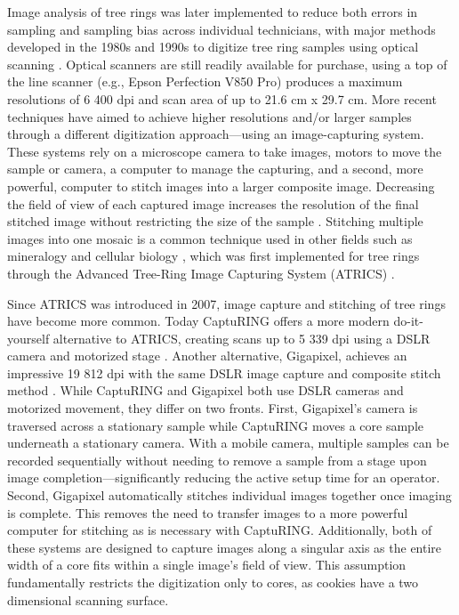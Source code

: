 \documentclass[a4paper,12pt]{article}
\begin{document}
Image analysis of tree rings was later implemented to reduce both errors in sampling and sampling bias across individual technicians, with major methods developed in the 1980s and 1990s to digitize tree ring samples using optical scanning \citep{mcmillin_application_1982} \citep{guay_new_1992}. Optical scanners are still readily available for purchase, using a top of the line scanner (e.g., Epson Perfection V850 Pro) produces a maximum resolutions of 6 400 dpi and scan area of up to 21.6 cm x 29.7 cm.
More recent techniques have aimed to achieve higher resolutions and/or larger samples through a different digitization approach---using an image-capturing system. These systems rely on a microscope camera to take images, motors to move the sample or camera, a computer to manage the capturing, and a second, more powerful, computer to stitch images into a larger composite image.
Decreasing the field of view of each captured image increases the resolution of the final stitched image without restricting the size of the sample \citep{muhlich_stitching_2022}.
Stitching multiple images into one mosaic is a common technique used in other fields such as mineralogy and cellular biology \citep{ro_image_2021,mohammadi_fast_2024}, which was
first implemented for tree rings through the Advanced Tree-Ring Image Capturing System (ATRICS) \citep{levanic_atrics_2007}. %

Since ATRICS was introduced in 2007, image capture and stitching of tree rings have become more common. Today CaptuRING offers a more modern do-it-yourself alternative to ATRICS, creating scans up to 5 339 dpi using a DSLR camera and motorized stage \citep{garcia-hidalgo_capturing_2022}. 
Another alternative, Gigapixel, achieves an impressive 19 812 dpi with the same DSLR image capture and composite stitch method \citep{griffin_gigapixel_2021}. 
While CaptuRING and Gigapixel both use DSLR cameras and motorized movement, they differ on two fronts. 
First, Gigapixel's camera is traversed across a stationary sample while CaptuRING moves a core sample underneath a stationary camera.
With a mobile camera, multiple samples can be recorded sequentially without needing to remove a sample from a stage upon image completion---significantly reducing the active setup time for an operator. 
Second, Gigapixel automatically stitches individual images together once imaging is complete. This removes the need to transfer images to a more powerful computer for stitching as is necessary with CaptuRING.
Additionally, both of these systems are designed to capture images along a singular axis as the entire width of a core fits within a single image's field of view.
This assumption fundamentally restricts the digitization only to cores, as cookies have a two dimensional scanning surface. %
\end{document}
